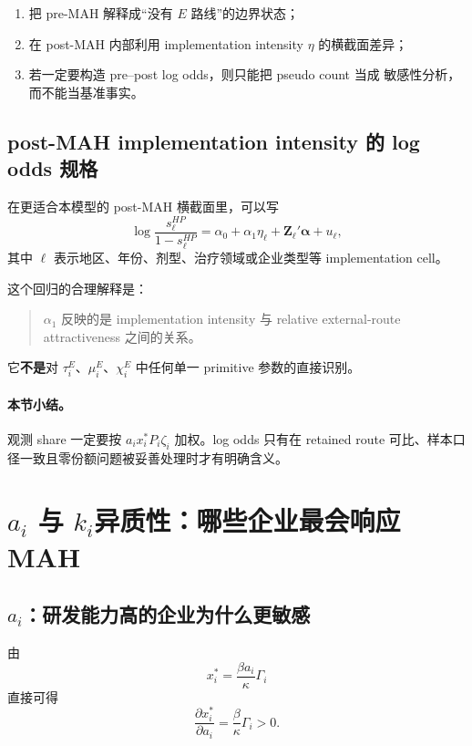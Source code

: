 \documentclass[12pt,UTF8]{ctexart}
\theoremstyle{plain}
\theoremstyle{remark}
\begin{document}
\begin{enumerate}[leftmargin=2em]
    \item 把 pre-MAH 解释成“没有 $E$ 路线”的边界状态；
    \item 在 post-MAH 内部利用 implementation intensity $\eta$ 的横截面差异；
    \item 若一定要构造 pre--post log odds，则只能把 pseudo count 当成
    敏感性分析，而不能当基准事实。
\end{enumerate}

\subsection{post-MAH implementation intensity 的 log odds 规格}

在更适合本模型的 post-MAH 横截面里，可以写
\begin{equation}
\log\frac{s_\ell^{HP}}{1-s_\ell^{HP}}
=
\alpha_0+\alpha_1\eta_\ell+\bm{Z}_\ell'\bm{\alpha}+u_\ell,
\label{eq:logodds_eta}
\end{equation}
其中 $\ell$ 表示地区、年份、剂型、治疗领域或企业类型等 implementation cell。

这个回归的合理解释是：

\begin{quote}
$\alpha_1$ 反映的是 implementation intensity 与 relative external-route
attractiveness 之间的关系。
\end{quote}

它\textbf{不是}对 $\tau_i^E$、$\mu_i^E$、$\chi_i^E$ 中任何单一 primitive
参数的直接识别。

\paragraph{本节小结。}
观测 share 一定要按 $a_i x_i^*P_i\zeta_i$ 加权。log odds 只有在 retained route
可比、样本口径一致且零份额问题被妥善处理时才有明确含义。

\section{\texorpdfstring{$a_i$ 与 $k_i$}{研发能力与生产能力}异质性：哪些企业最会响应 MAH}

\subsection{\texorpdfstring{$a_i$}{研发能力}：研发能力高的企业为什么更敏感}

由
\[
x_i^*=\frac{\beta a_i}{\kappa}\Gamma_i
\]
直接可得
\begin{equation}
\frac{\partial x_i^*}{\partial a_i}
=
\frac{\beta}{\kappa}\Gamma_i
>0.
\label{eq:dx_da}
\end{equation}
\end{document}
